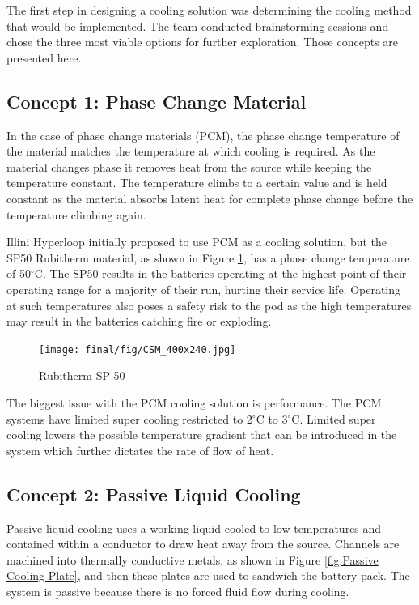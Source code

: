 \documentclass[11pt]{article}
\numberwithin{equation}{subsection} %
\newcommand{\degrees}{\ensuremath{^\circ}} %
\begin{document}
The first step in designing a cooling solution was determining the cooling method that would be implemented. The team conducted brainstorming sessions and chose the three most viable options for further exploration. Those concepts are presented here. 

\subsection{Concept 1: Phase Change Material}
In the case of phase change materials (PCM), the phase change temperature of the material matches the temperature at which cooling is required. As the material changes phase it removes heat from the source while keeping the temperature constant. The temperature climbs to a certain value and is held constant as the material absorbs latent heat for complete phase change before the temperature climbing again.


Illini Hyperloop initially proposed to use PCM as a cooling solution, but the SP50 Rubitherm material, as shown in Figure \ref{fig:RubithermSP-50}, has a phase change temperature of 50\degrees C. The SP50 results in the batteries operating at the highest point of their operating range for a majority of their run, hurting their service life. Operating at such temperatures also poses a safety risk to the pod as the high temperatures may result in the batteries catching fire or exploding.

\begin{figure}[!htb]
 \centering
	\texttt{[image: final/fig/CSM\_400x240.jpg]}
    \caption{Rubitherm SP-50}
    \label{fig:RubithermSP-50}
\end{figure}

 The biggest issue with the PCM cooling solution is performance. The PCM systems have limited super cooling restricted to 2\degrees C to 3\degrees C. Limited super cooling lowers the possible temperature gradient that can be introduced in the system which further dictates the rate of flow of heat. 

\subsection{Concept 2: Passive Liquid Cooling}
Passive liquid cooling uses a working liquid cooled to low temperatures and contained within a conductor to draw heat away from the source. Channels are machined into thermally conductive metals, as shown in Figure \ref{fig:Passive Cooling Plate}, and then these plates are used to sandwich the battery pack. The system is passive because there is no forced fluid flow during cooling.
\end{document}
